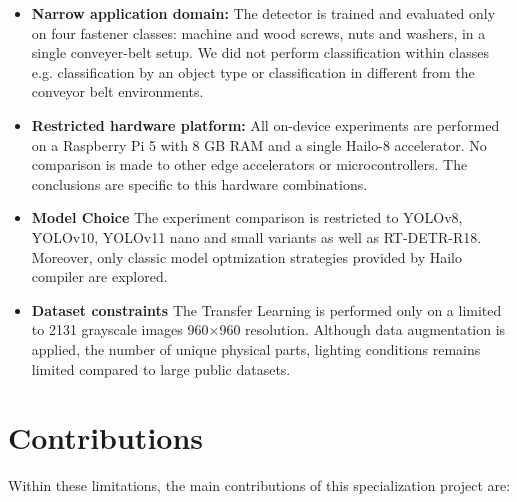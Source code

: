 \documentclass[12pt,a4paper]{report}
\begin{document}
    \begin{itemize}
        \item \textbf{Narrow application domain:} The detector is trained and evaluated
        only on four fastener classes: machine and wood screws, nuts and washers, in a single
        conveyer-belt setup. We did not perform classification within classes e.g. classification
        by an object type or classification in different from the conveyor belt environments.
        \item \textbf{Restricted hardware platform:} All on-device experiments are performed on a
        Raspberry Pi 5 with 8 GB RAM and a single Hailo-8 accelerator.
        No comparison is made to other edge accelerators or microcontrollers.
        The conclusions are specific to this hardware combinations.
        \item \textbf{Model Choice} The experiment comparison is restricted to YOLOv8, YOLOv10, YOLOv11
        nano and small variants as well as RT-DETR-R18. Moreover, only classic model optmization strategies
        provided by Hailo compiler are explored.
        \item \textbf{Dataset constraints} The Transfer Learning is performed only on a
        limited to 2131 grayscale images 960$\times$960 resolution. Although data augmentation
        is applied, the number of unique physical parts, lighting conditions remains limited
        compared to large public datasets.
    \end{itemize}

\section{Contributions}

    Within these limitations, the main contributions of this specialization project are:
\end{document}
